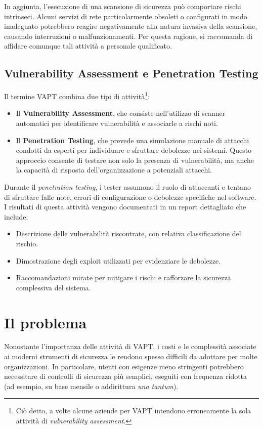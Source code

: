 In aggiunta, l'esecuzione di una scansione di sicurezza può comportare rischi intrinseci. Alcuni servizi di rete particolarmente obsoleti o configurati in modo inadeguato potrebbero reagire negativamente alla natura invasiva della scansione, causando interruzioni o malfunzionamenti. Per questa ragione, si raccomanda di affidare comunque tali attività a personale qualificato.

\subsection{Vulnerability Assessment e Penetration Testing}
Il termine VAPT combina due tipi di attività\footnote{Ciò detto, a volte alcune aziende per VAPT intendono erroneamente la sola attività di \emph{vulnerability assessment}.}:
\begin{itemize}
    \item Il \textbf{Vulnerability Assessment}, che consiste nell'utilizzo di scanner automatici per identificare vulnerabilità e associarle a rischi noti.
    \item Il \textbf{Penetration Testing}, che prevede una simulazione manuale di attacchi condotti da esperti per individuare e sfruttare debolezze nei sistemi. Questo approccio consente di testare non solo la presenza di vulnerabilità, ma anche la capacità di risposta dell'organizzazione a potenziali attacchi.
\end{itemize}

Durante il \emph{penetration testing}, i tester assumono il ruolo di attaccanti e tentano di sfruttare falle note, errori di configurazione o debolezze specifiche nel software. I risultati di questa attività vengono documentati in un report dettagliato che include:
\begin{itemize}
    \item Descrizione delle vulnerabilità riscontrate, con relativa classificazione del rischio.
    \item Dimostrazione degli exploit utilizzati per evidenziare le debolezze.
    \item Raccomandazioni mirate per mitigare i rischi e rafforzare la sicurezza complessiva del sistema.
\end{itemize}

\section{Il problema}
Nonostante l'importanza delle attività di VAPT, i costi e le complessità associate ai moderni strumenti di sicurezza le rendono spesso difficili da adottare per molte organizzazioni. In particolare, utenti con esigenze meno stringenti potrebbero necessitare di controlli di sicurezza più semplici, eseguiti con frequenza ridotta (ad esempio, su base mensile o addirittura \emph{una tantum}).

